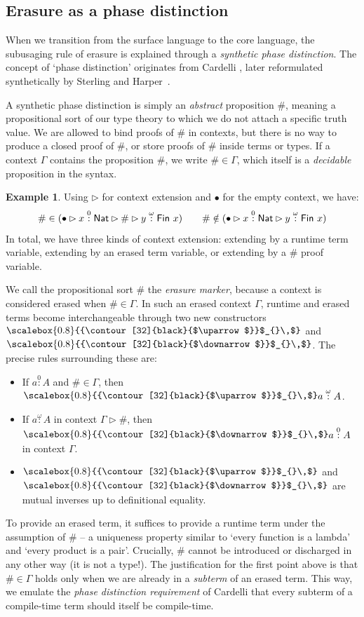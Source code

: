 \documentclass[10pt,a4paper]{article}
\theoremstyle{definition}
\newtheorem{example}[theorem]{Example}
\theoremstyle{remark}
\newcommand{\s}[1]{{\ensuremath{\textsf{\upshape #1}}}\xspace}
\newcommand{\col}[1]{\stackrel{#1}{:}}
\def\arrowscale{0.8}
\def\arrowshift{0.9pt}
\newcommand{\arrowwrap}[2]{%
  \text{\raisebox{\arrowshift}{\scalebox{\arrowscale}{{\contour[32]{black}{$#1$}}$_{#2}\,$}}}%
}
\newcommand{\uptm}[1][]{\arrowwrap{\uparrow}{#1}}
\newcommand{\downtm}[1][]{\arrowwrap{\downarrow}{#1}}
\begin{document}
\subsection{Erasure as a phase distinction}\label{sub:phase}


When we transition from the surface language to the core language, the
subusaging rule of erasure is explained through a \emph{synthetic phase
distinction}. The concept of `phase distinction' originates from Cardelli
\cite{Cardelli1988-zp}, later reformulated synthetically by Sterling and
Harper~\cite{Sterling2021-pm}.

A synthetic phase distinction is simply an \emph{abstract} proposition $\#$,
meaning a propositional sort of our type theory to which we do not attach a
specific truth value. We are allowed to bind proofs of $\#$ in contexts, but
there is no way to produce a closed proof of $\#$, or store proofs of $\#$
inside terms or types. If a context $\Gamma$ contains the proposition $\#$, we
write $\# \in \Gamma$, which itself is a \emph{decidable} proposition in the
syntax.

\begin{example}
Using $\rhd$ for context extension and $\bullet$
for the empty context, we have:
$$
\# \in (\bullet \rhd x \col{0} \s{Nat} \rhd \# \rhd y \col{\omega} \s{Fin}\ x) \qquad
\# \notin (\bullet \rhd x \col{0} \s{Nat} \rhd y \col{\omega} \s{Fin}\ x) 
$$
In total, we have three kinds of context extension:
extending by a runtime term variable, extending by an erased term variable, or extending
by a $\#$ proof variable.
\end{example}

We call the propositional sort $\#$ the \emph{erasure marker}, because a context
is considered erased when $\# \in \Gamma$. In such an erased context $\Gamma$,
runtime and erased terms become interchangeable through two new constructors
$\uptm$ and $\downtm$. The precise rules surrounding these are:
\begin{itemize}
    \item \label{item:marker-1} If $a \col{0} A$ and $\# \in \Gamma$,
      then ${\uptm a} \col{\omega} A$.
    \item \label{item:marker-2} If $a \col{\omega} A$ in context $\Gamma \rhd \#$, then ${\downtm a}
      \col{0} A$ in context $\Gamma$.
    \item \label{item:marker-3} $\uptm$ and $\downtm$ are mutual inverses up to definitional equality.
\end{itemize}
To provide an erased term, it suffices to provide a runtime term under the
assumption of $\#$ -- a uniqueness property similar to `every function is a
lambda' and `every product is a pair'. Crucially, $\#$ cannot be introduced or
discharged in any other way (it is not a type!). The justification for the first point above is that
$\# \in \Gamma$ holds only when we are already in a \emph{subterm} of an erased
term. This way, we emulate the \emph{phase distinction requirement} of Cardelli
that every subterm of a compile-time term should itself be compile-time.
\end{document}
